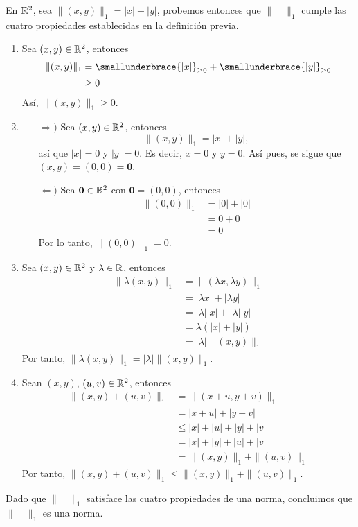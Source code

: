 \begin{example}
    En $\RR[2]$, sea $\| (x, y) \|_1 = |x| + |y|$, probemos entonces que $\| \quad \|_1$ cumple las cuatro propiedades establecidas en la definición previa.
    \begin{enumerate}[label=\roman*.]
        \item Sea $(x, y) \in \RR[2]$, entonces
        \begin{align*}
            \| (x, y) \|_1 & = \smallunderbrace{|x|}_{\geq 0} + \smallunderbrace{|y|}_{\geq 0} \\
            & \geq 0
        \end{align*}
        Así, $\| (x, y) \|_1 \geq 0$.
        \item \begin{enumerate}
            \item[$\Rightarrow)$] Sea $(x, y) \in \RR[2]$, entonces
            $$\| (x, y) \|_1 = |x| + |y|,$$
            así que $|x| = 0$ y $|y| = 0$. Es decir, $x = 0$ y $y = 0$. Así pues, se sigue que $(x, y) = (0, 0) = \mathbf{0}$.
            \item[$\Leftarrow)$] Sea $\mathbf{0} \in \RR[2]$ con $\mathbf{0} = (0, 0)$, entonces
            \begin{align*}
                \| (0, 0) \|_1 & = |0| + |0| \\
                & = 0 + 0 \\
                & = 0
            \end{align*}
            Por lo tanto, $\| (0, 0) \|_1 = 0$.
        \end{enumerate}
        \item Sea $(x, y) \in \RR[2]$ y $\lambda \in \RR$, entonces
        \begin{align*}
            \| \lambda (x, y) \|_1 & = \| (\lambda x, \lambda y) \|_1 \\
            & = |\lambda x| + |\lambda y| \\
            & = |\lambda| |x| + |\lambda| |y| \\
            & = \lambda \left( |x| + |y| \right) \\
            & = |\lambda| \| (x, y) \|_1
        \end{align*}
        Por tanto, $\| \lambda (x, y) \|_1 = |\lambda| \| (x, y) \|_1$.
        \item Sean $(x, y)$, $(u, v) \in \RR[2]$, entonces
        \begin{align*}
            \| (x, y) + (u, v) \|_1 & = \| (x + u, y + v) \|_1 \\
            & = |x + u| + |y + v| \\
            & \leq |x| + |u| + |y| + |v| \\
            & = |x| + |y| + |u| + |v| \\
            & = \| (x, y) \|_1 + \| (u, v) \|_1
        \end{align*}
        Por tanto, $\| (x, y) + (u, v) \|_1 \leq \| (x, y) \|_1 + \| (u, v) \|_1$.
    \end{enumerate}
    Dado que $\| \quad \|_1$ satisface las cuatro propiedades de una norma, concluimos que  $\| \quad \|_1$ es una norma.
\end{example}

